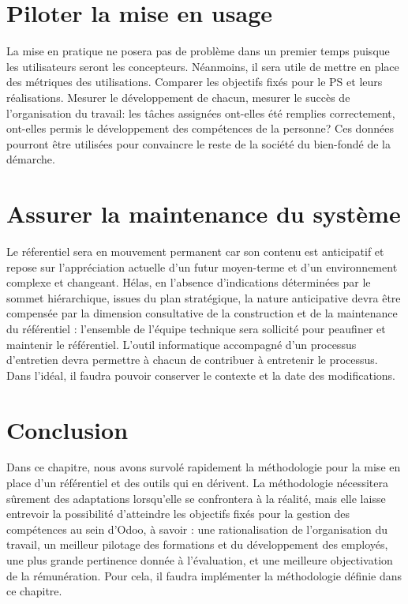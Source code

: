 \section{Piloter la mise en usage}
La mise en pratique ne posera pas de problème dans un premier temps puisque les utilisateurs seront les concepteurs. Néanmoins, il sera utile de mettre en place des métriques des utilisations. Comparer les objectifs fixés pour le PS et leurs réalisations. Mesurer le développement de chacun, mesurer le succès de l'organisation du travail: les tâches assignées ont-elles été remplies correctement, ont-elles permis le développement des compétences de la personne? Ces données pourront être utilisées pour convaincre le reste de la société du bien-fondé de la démarche. 

\section{Assurer la maintenance du système}
 Le réferentiel sera en mouvement permanent car son contenu est anticipatif et repose sur l’appréciation actuelle d’un futur moyen-terme et d’un environnement complexe et changeant. Hélas, en l'absence d'indications déterminées par le sommet hiérarchique, issues du plan stratégique, la nature anticipative devra être compensée par la dimension consultative de la construction et de la maintenance du référentiel : l’ensemble de l’équipe technique sera sollicité pour peaufiner et maintenir le référentiel. L'outil informatique accompagné d'un processus d'entretien devra permettre à chacun de contribuer à entretenir le processus. Dans l'idéal, il faudra pouvoir conserver le contexte et la date des modifications.
 
 
 \section{Conclusion}
 Dans ce chapitre, nous avons survolé rapidement la méthodologie pour la mise en place d'un référentiel et des outils qui en dérivent. La méthodologie nécessitera sûrement des adaptations lorsqu'elle se confrontera à la réalité, mais elle laisse entrevoir la possibilité d'atteindre les objectifs fixés pour la gestion des compétences au sein d'Odoo, à savoir : une rationalisation de l'organisation du travail, un meilleur pilotage des formations et du développement des employés, une plus grande pertinence donnée à l'évaluation, et une meilleure objectivation de la rémunération. Pour cela, il faudra implémenter la méthodologie définie dans ce chapitre.


